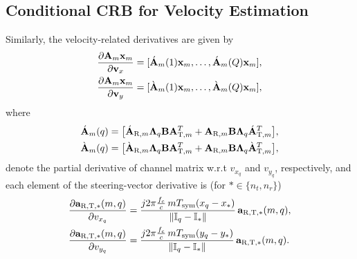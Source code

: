 \documentclass[9pt,final,journal,twocolumn]{IEEEtran}
\newtheorem{remark}{Remark}
\begin{document}
%
\vspace{-0.2cm}
\subsection{Conditional CRB for Velocity Estimation}
\vspace{-0.1cm}
Similarly, the velocity-related derivatives are given by
\begin{subequations}\label{Derivation_vel_NB}
\begin{align}
  \frac{\partial{\bf A}_{m}{\bf x}_{m}}{\partial{\bf v}_x}
  &= [\acute{\bf A}_{m}(1){\bf x}_{m},\ldots,\acute{\bf A}_{m}(Q){\bf x}_{m}], \\
  \frac{\partial{\bf A}_{m}{\bf x}_{m}}{\partial{\bf v}_y}
  &= [\grave{\bf A}_{m}(1){\bf x}_{m},\ldots,\grave{\bf A}_{m}(Q){\bf x}_{m}],
\end{align}
\end{subequations}
where
\begin{align*}
\acute{\bf A}_{m}(q)
&=\big[{\acute{\bf A}_{\mathrm{R},m}}{\bf \Lambda}_{q}{\bf B}{\bf A}_{\mathrm{T},m}^{T}
+{\bf A}_{\mathrm{R},m}{\bf B}{\bf \Lambda}_{q}{\acute{\bf A}_{\mathrm{T},m}^{T}}\big],\\
\grave{\bf A}_{m}(q)
&=\big[{\grave{\bf A}_{\mathrm{R},m}}{\bf \Lambda}_{q}{\bf B}{\bf A}_{\mathrm{T},m}^{T}
+{\bf A}_{\mathrm{R},m}{\bf B}{\bf \Lambda}_{q}{\grave{\bf A}_{\mathrm{T},m}^{T}}\big],
\end{align*}
denote the partial derivative of channel matrix w.r.t $v_{x_q}$ and $v_{y_q}$, respectively, and  each element of the steering-vector derivative is (for $\ast\in\{n_t,n_r\}$)
\begin{align*}
\frac{\partial{\bf a}_{\mathrm{R},\mathrm{T},\ast}(m,q)}{\partial v_{x_q}}
&=
\frac{j2\pi\frac{f_c}{c}\,mT_{\mathrm{sym}}(x_q-x_{\ast})}{\|{\mathbb I}_q-{\mathbb I}_{\ast}\|}
\,{\bf a}_{\mathrm{R},\mathrm{T},\ast}(m,q),\\
\frac{\partial{\bf a}_{\mathrm{R},\mathrm{T},\ast}(m,q)}{\partial v_{y_q}}
&=
\frac{j2\pi\frac{f_c}{c}\,mT_{\mathrm{sym}}(y_q-y_{\ast})}{\|{\mathbb I}_q-{\mathbb I}_{\ast}\|}
\,{\bf a}_{\mathrm{R},\mathrm{T},\ast}(m,q).
\end{align*}
\end{document}
